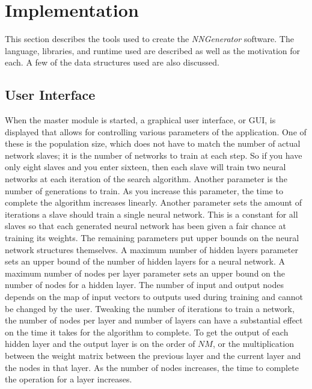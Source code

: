 \chapter[Implementation]{Implementation}
This section describes the tools used to create the {\em NNGenerator} software. 
The language, libraries, and runtime used are described as well as the motivation for each. 
A few of the data structures used are also discussed.



\section{User Interface}
When the master module is started, a graphical user interface, or GUI, is displayed that allows for controlling various parameters of the application. 
One of these is the population size, which does not have to match the number of actual network slaves; it is the number of networks to train at each step. 
So if you have only eight slaves and you enter sixteen, then each slave will train two neural networks at each iteration of the search algorithm. 
Another parameter is the number of generations to train. 
As you increase this parameter, the time to complete the algorithm increases linearly. 
Another parameter sets the amount of iterations a slave should train a single neural network. 
This is a constant for all slaves so that each generated neural network has been given a fair chance at training its weights. 
The remaining parameters put upper bounds on the neural network structures themselves. 
A maximum number of hidden layers parameter sets an upper bound of the number of hidden layers for a neural network. 
A maximum number of nodes per layer parameter sets an upper bound on the number of nodes for a hidden layer. 
The number of input and output nodes depends on the map of input vectors to outputs used during training and cannot be changed by the user. 
Tweaking the number of iterations to train a network, the number of nodes per layer and number of layers can have a substantial effect on the time it takes for the algorithm to complete. 
To get the output of each hidden layer and the output layer is on the order of $NM$, or the multiplication between the weight matrix between the previous layer and the current layer and the nodes in that layer. 
As the number of nodes increases, the time to complete the operation for a layer increases.

